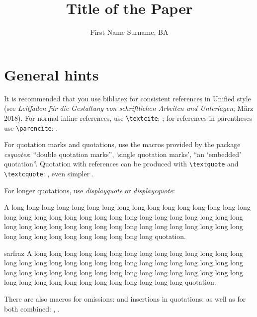 \documentclass[naustrian,english]{univie-ling-paper}
\author{First Name Surname, BA}
\title{Title of the Paper}
\begin{document}
\maketitle

\makedeclaration

\tableofcontents

\section{General hints}\label{sec:hints}

It is recommended that you use \textsf{biblatex} for consistent references in Unified style
(see \foreignlanguage{naustrian}{\emph{Leitfaden für die Gestaltung von schriftlichen Arbeiten und Unterlagen}; März 2018}).
For normal inline references, use \verb|\textcite|: \textcite[22]{sarfraz}; for references in parentheses use \verb|\parencite|:
\parencite{sarfraz}.

For quotation marks and quotations, use the macros provided by the package \emph{csquotes}: \enquote{double quotation marks},
\enquote*{single quotation marks}, \enquote{an \enquote{embedded} quotation}. Quotation with references can be produced with
\verb|\textquote| and \verb|\textcquote|: , even simpler
.

For longer quotations, use \emph{displayquote} or \emph{displaycquote}:

\begin{displayquote}
	A long long long long long long long long long long long long long long long long long long
	long long long long long long long long long long long long long long long long long long long long
	long long long long long long long long long long long long long long long long long long long long
	quotation.
\end{displayquote}

\begin{displaycquote}[246]{sarfraz}
	A long long long long long long long long long long long long long long long long long long
	long long long long long long long long long long long long long long long long long long long long
	long long long long long long long long long long long long long long long long long long long long
	quotation.
\end{displaycquote}
%
There are also macros for omissions: \textelp{} and insertions in quotations:  as well as for both combined:
, .
\end{document}
